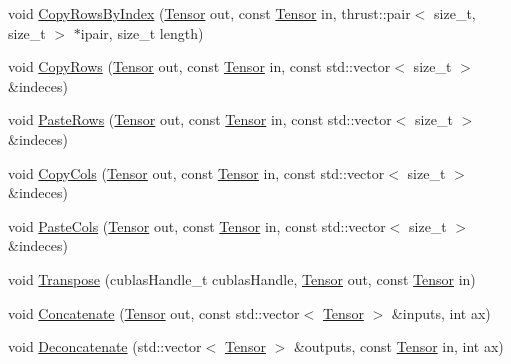 \begin{DoxyCompactItemize}
\item 
void \hyperlink{namespacemarian_a73ee0cc090c0041df53e3732c5b04462}{Copy\+Rows\+By\+Index} (\hyperlink{namespacemarian_a88b71ec34bb354564cddc24eb80f7e14}{Tensor} out, const \hyperlink{namespacemarian_a88b71ec34bb354564cddc24eb80f7e14}{Tensor} in, thrust\+::pair$<$ size\+\_\+t, size\+\_\+t $>$ $\ast$ipair, size\+\_\+t length)
\item 
void \hyperlink{namespacemarian_ab292638adfb1873067440a6af74d5ed5}{Copy\+Rows} (\hyperlink{namespacemarian_a88b71ec34bb354564cddc24eb80f7e14}{Tensor} out, const \hyperlink{namespacemarian_a88b71ec34bb354564cddc24eb80f7e14}{Tensor} in, const std\+::vector$<$ size\+\_\+t $>$ \&indeces)
\item 
void \hyperlink{namespacemarian_aed67e17a4ad7b437ef6361538d1a0023}{Paste\+Rows} (\hyperlink{namespacemarian_a88b71ec34bb354564cddc24eb80f7e14}{Tensor} out, const \hyperlink{namespacemarian_a88b71ec34bb354564cddc24eb80f7e14}{Tensor} in, const std\+::vector$<$ size\+\_\+t $>$ \&indeces)
\item 
void \hyperlink{namespacemarian_a7b1294cb49c42d55331bccbf1def82ba}{Copy\+Cols} (\hyperlink{namespacemarian_a88b71ec34bb354564cddc24eb80f7e14}{Tensor} out, const \hyperlink{namespacemarian_a88b71ec34bb354564cddc24eb80f7e14}{Tensor} in, const std\+::vector$<$ size\+\_\+t $>$ \&indeces)
\item 
void \hyperlink{namespacemarian_afd1a77f3d0ba7b8b2f1e8daf788159d1}{Paste\+Cols} (\hyperlink{namespacemarian_a88b71ec34bb354564cddc24eb80f7e14}{Tensor} out, const \hyperlink{namespacemarian_a88b71ec34bb354564cddc24eb80f7e14}{Tensor} in, const std\+::vector$<$ size\+\_\+t $>$ \&indeces)
\item 
void \hyperlink{namespacemarian_a170142cc4ea06bbb5f76a15a8da4487c}{Transpose} (cublas\+Handle\+\_\+t cublas\+Handle, \hyperlink{namespacemarian_a88b71ec34bb354564cddc24eb80f7e14}{Tensor} out, const \hyperlink{namespacemarian_a88b71ec34bb354564cddc24eb80f7e14}{Tensor} in)
\item 
void \hyperlink{namespacemarian_a680fee5f243683d820950c554db89df7}{Concatenate} (\hyperlink{namespacemarian_a88b71ec34bb354564cddc24eb80f7e14}{Tensor} out, const std\+::vector$<$ \hyperlink{namespacemarian_a88b71ec34bb354564cddc24eb80f7e14}{Tensor} $>$ \&inputs, int ax)
\item 
void \hyperlink{namespacemarian_a09b0dc48a7ac0f9ed26bb50045d7cf1c}{Deconcatenate} (std\+::vector$<$ \hyperlink{namespacemarian_a88b71ec34bb354564cddc24eb80f7e14}{Tensor} $>$ \&outputs, const \hyperlink{namespacemarian_a88b71ec34bb354564cddc24eb80f7e14}{Tensor} in, int ax)

\end{DoxyCompactItemize}
